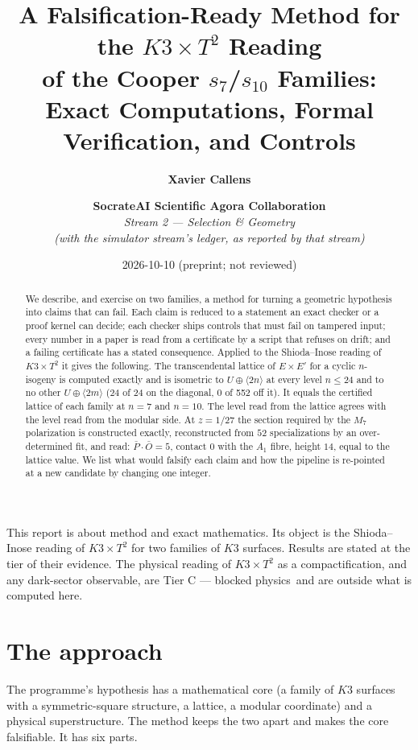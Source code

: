 \documentclass[11pt,a4paper]{article}
\title{\Large \textbf{A Falsification-Ready Method for the $K3\times T^2$ Reading}\\[0.2em]
\textbf{of the Cooper $s_7$/$s_{10}$ Families:}\\[0.2em]
\textbf{Exact Computations, Formal Verification, and Controls}}
\author{\textbf{Xavier Callens} \and \textbf{SocrateAI Scientific Agora Collaboration} \\[0.3em]
\textit{Stream 2 --- Selection \& Geometry} \\
\textit{(with the simulator stream's ledger, as reported by that stream)}}
\date{2026-10-10 \quad (preprint; not reviewed)}
\theoremstyle{remark}
\newcommand{\tierC}{\colorbox{orange!15}{\textsf{\scriptsize Tier C --- blocked physics}}}
\begin{document}
\maketitle

\begin{scopebox}
This report is about method and exact mathematics. Its object is the Shioda--Inose reading of $K3\times T^2$ for two families of
$K3$ surfaces. Results are stated at the tier of their evidence. The physical reading of $K3\times T^2$ as a compactification, and any
dark-sector observable, are \tierC\ and are outside what is computed here.
\end{scopebox}

\begin{abstract}
We describe, and exercise on two families, a method for turning a geometric hypothesis into claims that can fail. Each claim is
reduced to a statement an exact checker or a proof kernel can decide; each checker ships controls that must fail on tampered input;
every number in a paper is read from a certificate by a script that refuses on drift; and a failing certificate has a stated
consequence. Applied to the Shioda--Inose reading of $K3\times T^2$ it gives the following. The transcendental lattice of
$E\times E'$ for a cyclic $n$-isogeny is computed exactly and is isometric to $U\oplus\langle 2n\rangle$ at every level $n\le24$ and to
no other $U\oplus\langle 2m\rangle$ (24 of 24 on the diagonal, 0 of 552 off it). It equals the certified lattice of each family at
$n=7$ and $n=10$. The level read from the lattice agrees with the level read from the modular side. At $z=1/27$ the section required
by the $M_7$ polarization is constructed exactly, reconstructed from $52$ specializations by an over-determined fit, and read:
$\bar P\cdot\bar O=5$, contact $0$ with the $A_1$ fibre, height $14$, equal to the lattice value. We list what would falsify each
claim and how the pipeline is re-pointed at a new candidate by changing one integer.
\end{abstract}

\tableofcontents

\section{The approach}\label{sec:approach}

The programme's hypothesis has a mathematical core (a family of $K3$ surfaces with a symmetric-square structure, a lattice, a
modular coordinate) and a physical superstructure. The method keeps the two apart and makes the core falsifiable. It has six parts.
\end{document}
